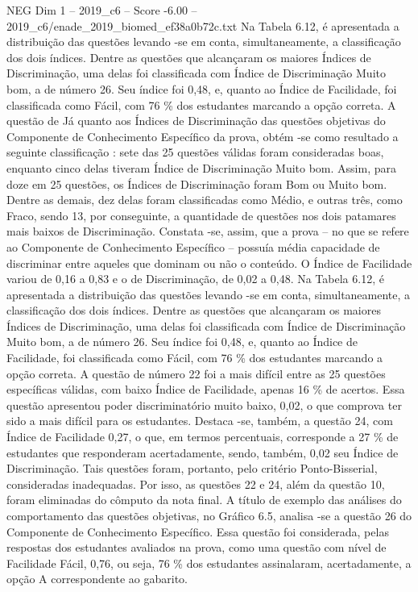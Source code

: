 \begin{textsample}{NEG Dim 1 – 2019\_c6 – Score -6.00 – 2019\_c6/enade\_2019\_biomed\_ef38a0b72c.txt}
Na Tabela 6.12, é apresentada a distribuição das questões levando -se em conta, simultaneamente, a classificação dos dois índices.
Dentre as questões que alcançaram os maiores Índices de Discriminação, uma delas foi classificada com Índice de Discriminação Muito bom, a de número 26.
Seu índice foi 0,48, e, quanto ao Índice de Facilidade, foi classificada como Fácil, com 76 \% dos estudantes marcando a opção correta.
A questão de Já quanto aos Índices de Discriminação das questões objetivas do Componente de Conhecimento Específico da prova, obtém -se como resultado a seguinte classificação : sete das 25 questões válidas foram consideradas boas, enquanto cinco delas tiveram Índice de Discriminação Muito bom.
Assim, para doze em 25 questões, os Índices de Discriminação foram Bom ou Muito bom.
Dentre as demais, dez delas foram classificadas como Médio, e outras três, como Fraco, sendo 13, por conseguinte, a quantidade de questões nos dois patamares mais baixos de Discriminação.
Constata -se, assim, que a prova – no que se refere ao Componente de Conhecimento Específico – possuía média capacidade de discriminar entre aqueles que dominam ou não o conteúdo.
O Índice de Facilidade variou de 0,16 a 0,83 e o de Discriminação, de 0,02 a 0,48.
Na Tabela 6.12, é apresentada a distribuição das questões levando -se em conta, simultaneamente, a classificação dos dois índices.
Dentre as questões que alcançaram os maiores Índices de Discriminação, uma delas foi classificada com Índice de Discriminação Muito bom, a de número 26.
Seu índice foi 0,48, e, quanto ao Índice de Facilidade, foi classificada como Fácil, com 76 \% dos estudantes marcando a opção correta.
A questão de número 22 foi a mais difícil entre as 25 questões específicas válidas, com baixo Índice de Facilidade, apenas 16 \% de acertos.
Essa questão apresentou poder discriminatório muito baixo, 0,02, o que comprova ter sido a mais difícil para os estudantes.
Destaca -se, também, a questão 24, com Índice de Facilidade 0,27, o que, em termos percentuais, corresponde a 27 \% de estudantes que responderam acertadamente, sendo, também, 0,02 seu Índice de Discriminação.
Tais questões foram, portanto, pelo critério Ponto-Bisserial, consideradas inadequadas.
Por isso, as questões 22 e 24, além da questão 10, foram eliminadas do cômputo da nota final.
A título de exemplo das análises do comportamento das questões objetivas, no Gráfico 6.5, analisa -se a questão 26 do Componente de Conhecimento Específico.
Essa questão foi considerada, pelas respostas dos estudantes avaliados na prova, como uma questão com nível de Facilidade Fácil, 0,76, ou seja, 76 \% dos estudantes assinalaram, acertadamente, a opção A correspondente ao gabarito.

\end{textsample}

